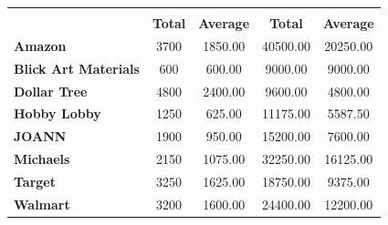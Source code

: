 \documentclass[border=10pt]{standalone}
\begin{document}
\begin{tabular}{>{\color{white}\bfseries}l|*{4}{>{\color{black}}S[table-format=5.2]}}
\toprule
{} &  &  \\
\cmidrule(lr){2-3} \cmidrule(lr){4-5}
& \textbf{Total} & \textbf{Average} & \textbf{Total} & \textbf{Average} \\
\midrule
{}
Amazon & 3700 & 1850.00 & 40500.00 & 20250.00 \\
Blick Art Materials & 600 & 600.00 & 9000.00 & 9000.00 \\
Dollar Tree & 4800 & 2400.00 & 9600.00 & 4800.00 \\
Hobby Lobby & 1250 & 625.00 & 11175.00 & 5587.50 \\
JOANN & 1900 & 950.00 & 15200.00 & 7600.00 \\
Michaels & 2150 & 1075.00 & 32250.00 & 16125.00 \\
Target & 3250 & 1625.00 & 18750.00 & 9375.00 \\
Walmart & 3200 & 1600.00 & 24400.00 & 12200.00 \\
\bottomrule
\end{tabular}
\end{document}
